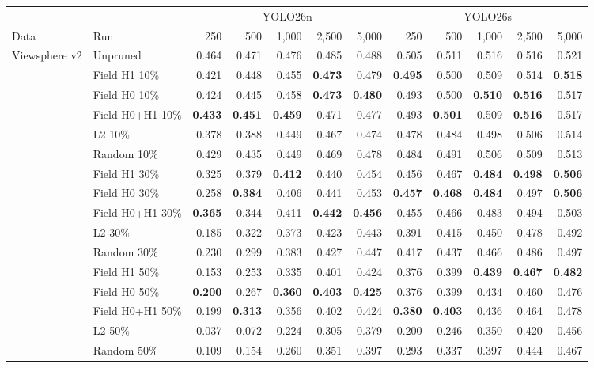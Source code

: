\begin{tabular}{llrrrrrrrrrr}
\toprule
 & & \multicolumn{5}{c}{YOLO26n} & \multicolumn{5}{c}{YOLO26s} \\
\cmidrule(lr){3-7}\cmidrule(lr){8-12}
Data & Run & 250 & 500 & 1,000 & 2,500 & 5,000 & 250 & 500 & 1,000 & 2,500 & 5,000 \\
\midrule
Viewsphere v2 & Unpruned & 0.464 & 0.471 & 0.476 & 0.485 & 0.488 & 0.505 & 0.511 & 0.516 & 0.516 & 0.521 \\
 & Field H1 10\% & 0.421 & 0.448 & 0.455 & \textbf{0.473} & 0.479 & \textbf{0.495} & 0.500 & 0.509 & 0.514 & \textbf{0.518} \\
 & Field H0 10\% & 0.424 & 0.445 & 0.458 & \textbf{0.473} & \textbf{0.480} & 0.493 & 0.500 & \textbf{0.510} & \textbf{0.516} & 0.517 \\
 & Field H0+H1 10\% & \textbf{0.433} & \textbf{0.451} & \textbf{0.459} & 0.471 & 0.477 & 0.493 & \textbf{0.501} & 0.509 & \textbf{0.516} & 0.517 \\
 & L2 10\% & 0.378 & 0.388 & 0.449 & 0.467 & 0.474 & 0.478 & 0.484 & 0.498 & 0.506 & 0.514 \\
 & Random 10\% & 0.429 & 0.435 & 0.449 & 0.469 & 0.478 & 0.484 & 0.491 & 0.506 & 0.509 & 0.513 \\
\addlinespace[2pt]
 & Field H1 30\% & 0.325 & 0.379 & \textbf{0.412} & 0.440 & 0.454 & 0.456 & 0.467 & \textbf{0.484} & \textbf{0.498} & \textbf{0.506} \\
 & Field H0 30\% & 0.258 & \textbf{0.384} & 0.406 & 0.441 & 0.453 & \textbf{0.457} & \textbf{0.468} & \textbf{0.484} & 0.497 & \textbf{0.506} \\
 & Field H0+H1 30\% & \textbf{0.365} & 0.344 & 0.411 & \textbf{0.442} & \textbf{0.456} & 0.455 & 0.466 & 0.483 & 0.494 & 0.503 \\
 & L2 30\% & 0.185 & 0.322 & 0.373 & 0.423 & 0.443 & 0.391 & 0.415 & 0.450 & 0.478 & 0.492 \\
 & Random 30\% & 0.230 & 0.299 & 0.383 & 0.427 & 0.447 & 0.417 & 0.437 & 0.466 & 0.486 & 0.497 \\
\addlinespace[2pt]
 & Field H1 50\% & 0.153 & 0.253 & 0.335 & 0.401 & 0.424 & 0.376 & 0.399 & \textbf{0.439} & \textbf{0.467} & \textbf{0.482} \\
 & Field H0 50\% & \textbf{0.200} & 0.267 & \textbf{0.360} & \textbf{0.403} & \textbf{0.425} & 0.376 & 0.399 & 0.434 & 0.460 & 0.476 \\
 & Field H0+H1 50\% & 0.199 & \textbf{0.313} & 0.356 & 0.402 & 0.424 & \textbf{0.380} & \textbf{0.403} & 0.436 & 0.464 & 0.478 \\
 & L2 50\% & 0.037 & 0.072 & 0.224 & 0.305 & 0.379 & 0.200 & 0.246 & 0.350 & 0.420 & 0.456 \\
 & Random 50\% & 0.109 & 0.154 & 0.260 & 0.351 & 0.397 & 0.293 & 0.337 & 0.397 & 0.444 & 0.467 \\
\bottomrule
\end{tabular}
